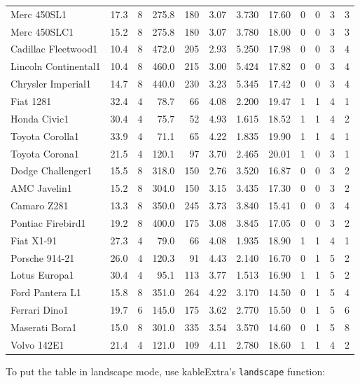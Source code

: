 \documentclass[a4paper, nobind]{templates/ociamthesis}
\begin{document}
\begin{longtable}{lrrrrrrrrrrr}
Merc 450SL1 & 17.3 & 8 & 275.8 & 180 & 3.07 & 3.730 & 17.60 & 0 & 0 & 3 & 3\\
\addlinespace
Merc 450SLC1 & 15.2 & 8 & 275.8 & 180 & 3.07 & 3.780 & 18.00 & 0 & 0 & 3 & 3\\
Cadillac Fleetwood1 & 10.4 & 8 & 472.0 & 205 & 2.93 & 5.250 & 17.98 & 0 & 0 & 3 & 4\\
Lincoln Continental1 & 10.4 & 8 & 460.0 & 215 & 3.00 & 5.424 & 17.82 & 0 & 0 & 3 & 4\\
Chrysler Imperial1 & 14.7 & 8 & 440.0 & 230 & 3.23 & 5.345 & 17.42 & 0 & 0 & 3 & 4\\
Fiat 1281 & 32.4 & 4 & 78.7 & 66 & 4.08 & 2.200 & 19.47 & 1 & 1 & 4 & 1\\
\addlinespace
Honda Civic1 & 30.4 & 4 & 75.7 & 52 & 4.93 & 1.615 & 18.52 & 1 & 1 & 4 & 2\\
Toyota Corolla1 & 33.9 & 4 & 71.1 & 65 & 4.22 & 1.835 & 19.90 & 1 & 1 & 4 & 1\\
Toyota Corona1 & 21.5 & 4 & 120.1 & 97 & 3.70 & 2.465 & 20.01 & 1 & 0 & 3 & 1\\
Dodge Challenger1 & 15.5 & 8 & 318.0 & 150 & 2.76 & 3.520 & 16.87 & 0 & 0 & 3 & 2\\
AMC Javelin1 & 15.2 & 8 & 304.0 & 150 & 3.15 & 3.435 & 17.30 & 0 & 0 & 3 & 2\\
\addlinespace
Camaro Z281 & 13.3 & 8 & 350.0 & 245 & 3.73 & 3.840 & 15.41 & 0 & 0 & 3 & 4\\
Pontiac Firebird1 & 19.2 & 8 & 400.0 & 175 & 3.08 & 3.845 & 17.05 & 0 & 0 & 3 & 2\\
Fiat X1-91 & 27.3 & 4 & 79.0 & 66 & 4.08 & 1.935 & 18.90 & 1 & 1 & 4 & 1\\
Porsche 914-21 & 26.0 & 4 & 120.3 & 91 & 4.43 & 2.140 & 16.70 & 0 & 1 & 5 & 2\\
Lotus Europa1 & 30.4 & 4 & 95.1 & 113 & 3.77 & 1.513 & 16.90 & 1 & 1 & 5 & 2\\
\addlinespace
Ford Pantera L1 & 15.8 & 8 & 351.0 & 264 & 4.22 & 3.170 & 14.50 & 0 & 1 & 5 & 4\\
Ferrari Dino1 & 19.7 & 6 & 145.0 & 175 & 3.62 & 2.770 & 15.50 & 0 & 1 & 5 & 6\\
Maserati Bora1 & 15.0 & 8 & 301.0 & 335 & 3.54 & 3.570 & 14.60 & 0 & 1 & 5 & 8\\
Volvo 142E1 & 21.4 & 4 & 121.0 & 109 & 4.11 & 2.780 & 18.60 & 1 & 1 & 4 & 2\\*
\end{longtable}
\endgroup{}

To put the table in landscape mode, use kableExtra's \texttt{landscape} function:
\end{document}
